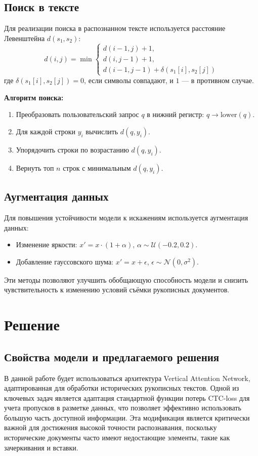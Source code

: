 \documentclass{article}
\begin{document}
    \subsection{Поиск в тексте}
    Для реализации поиска в распознанном тексте используется расстояние Левенштейна $d(s_1, s_2)$:
    \[
    d(i, j) = \min \left\{
    \begin{array}{l}
        d(i-1, j) + 1, \\
        d(i, j-1) + 1, \\
        d(i-1, j-1) + \delta(s_1[i], s_2[j])
    \end{array} \right.
    \]
    где $\delta(s_1[i], s_2[j]) = 0$, если символы совпадают, и $1$ — в противном случае.

    \textbf{Алгоритм поиска:}
    \begin{enumerate}
        \item Преобразовать пользовательский запрос $q$ в нижний регистр: $q \rightarrow \text{lower}(q)$.
        \item Для каждой строки $y_i$ вычислить $d(q, y_i)$.
        \item Упорядочить строки по возрастанию $d(q, y_i)$.
        \item Вернуть топ $n$ строк с минимальным $d(q, y_i)$.
    \end{enumerate}

    \subsection{Аугментация данных}
    Для повышения устойчивости модели к искажениям используется аугментация данных:
    \begin{itemize}
        \item Изменение яркости: $x' = x \cdot (1 + \alpha)$, $\alpha \sim \mathcal{U}(-0.2, 0.2)$.
        \item Добавление гауссовского шума: $x' = x + \epsilon$, $\epsilon \sim \mathcal{N}(0, \sigma^2)$.
    \end{itemize}
    Эти методы позволяют улучшить обобщающую способность модели и снизить чувствительность к изменению условий съёмки рукописных документов.



\section{Решение}
\subsection{Свойства модели и предлагаемого решения}
В данной работе будет использоваться архитектура Vertical Attention Network, адаптированная для обработки исторических рукописных текстов. Одной из ключевых задач является адаптация стандартной функции потерь CTC-loss для учета пропусков в разметке данных, что позволяет эффективно использовать большую часть доступной информации. Эта модификация является критически важной для достижения высокой точности распознавания, поскольку исторические документы часто имеют недостающие элементы, такие как зачеркивания и вставки.
\end{document}
